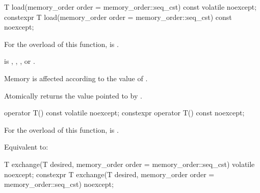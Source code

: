 %
%
%
%
%
%
\begin{itemdecl}
T load(memory_order order = memory_order::seq_cst) const volatile noexcept;
constexpr T load(memory_order order = memory_order::seq_cst) const noexcept;
\end{itemdecl}

\begin{itemdescr}
\pnum
\constraints
For the  overload of this function,
 is .

\pnum
\expects
{} is
,
,
, or
.

\pnum
\effects
Memory is affected according to the value of .

\pnum
\returns
Atomically returns the value pointed to by .
\end{itemdescr}

%
%
%
%
\begin{itemdecl}
operator T() const volatile noexcept;
constexpr operator T() const noexcept;
\end{itemdecl}

\begin{itemdescr}
\pnum
\constraints
For the  overload of this function,
 is .

\pnum
\effects
Equivalent to: 
\end{itemdescr}


%
%
%
%
%
%
\begin{itemdecl}
T exchange(T desired, memory_order order = memory_order::seq_cst) volatile noexcept;
constexpr T exchange(T desired, memory_order order = memory_order::seq_cst) noexcept;
\end{itemdecl}

